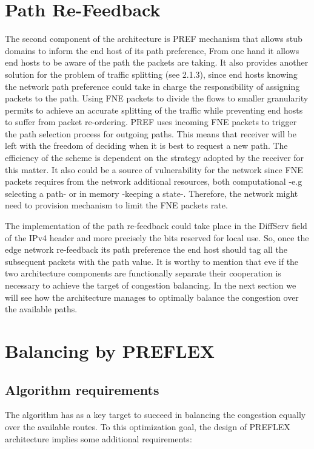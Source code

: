 \section{Path Re-Feedback}

The second component of the architecture is PREF mechanism that allows stub domains to inform the end host of its path preference, From one hand it allows end hosts to be aware of the path the packets are taking. It also provides another solution for the problem of traffic splitting (see 2.1.3), since end hosts knowing the network path preference could take in charge the responsibility of assigning packets to the path. Using FNE packets to divide the flows to smaller granularity permits to achieve an accurate splitting of the traffic while preventing end hosts to suffer from packet re-ordering. PREF uses incoming FNE packets to trigger the path selection process for outgoing paths. This means that receiver will be left with the freedom of deciding when it is best to request a new path. The efficiency of the scheme is dependent on the strategy adopted by the receiver for this matter. It also could be a source of vulnerability for the network since FNE packets requires from the network  additional resources, both computational -e.g selecting a path- or in memory -keeping a state-. Therefore, the network might need to provision mechanism to limit the FNE packets rate.

The implementation of the path re-feedback could take place in the DiffServ field of the IPv4 header and more precisely the bits reserved for local use. So, once the edge network re-feedback its path preference the end host should tag all the subsequent packets with the path value.
It is worthy to mention that eve if the two architecture components are functionally separate their cooperation is necessary to achieve the target of congestion balancing. In the next section we will see how the architecture manages to optimally balance the congestion over the available paths.

\section{Balancing by PREFLEX}

\subsection{Algorithm requirements}
The algorithm has as a key target to succeed in balancing the congestion equally over the available routes. To this optimization goal, the design of PREFLEX architecture implies some additional requirements: 

